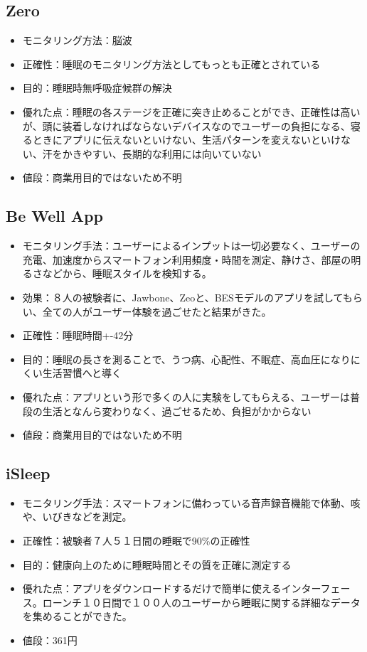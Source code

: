 \subsection{Zero}
\begin{itemize}
\item モニタリング方法：脳波 \cite{beWellApp}
\item 正確性：睡眠のモニタリング方法としてもっとも正確とされている
\item 目的：睡眠時無呼吸症候群の解決
\item 優れた点：睡眠の各ステージを正確に突き止めることができ、正確性は高いが、頭に装着しなければならないデバイスなのでユーザーの負担になる、寝るときにアプリに伝えないといけない、生活パターンを変えないといけない、汗をかきやすい、長期的な利用には向いていない
\item 値段：商業用目的ではないため不明
\end{itemize}

\subsection{Be Well App}
\begin{itemize}
\item モニタリング手法：ユーザーによるインプットは一切必要なく、ユーザーの充電、加速度からスマートフォン利用頻度・時間を測定、静けさ、部屋の明るさなどから、睡眠スタイルを検知する。 \cite{beWellApp}
\item 効果：８人の被験者に、Jawbone、Zeoと、BESモデルのアプリを試してもらい、全ての人がユーザー体験を過ごせたと結果がきた。
\item 正確性：睡眠時間+-42分
\item 目的：睡眠の長さを測ることで、うつ病、心配性、不眠症、高血圧になりにくい生活習慣へと導く
\item 優れた点：アプリという形で多くの人に実験をしてもらえる、ユーザーは普段の生活となんら変わりなく、過ごせるため、負担がかからない
\item 値段：商業用目的ではないため不明
\end{itemize}

\subsection{iSleep}
\begin{itemize}
\item モニタリング手法：スマートフォンに備わっている音声録音機能で体動、咳や、いびきなどを測定。 \cite{iSleep}
\item 正確性：被験者７人５１日間の睡眠で90\%の正確性
\item 目的：健康向上のために睡眠時間とその質を正確に測定する
\item 優れた点：アプリをダウンロードするだけで簡単に使えるインターフェース。ローンチ１０日間で１００人のユーザーから睡眠に関する詳細なデータを集めることができた。
\item 値段：361円
\end{itemize}

